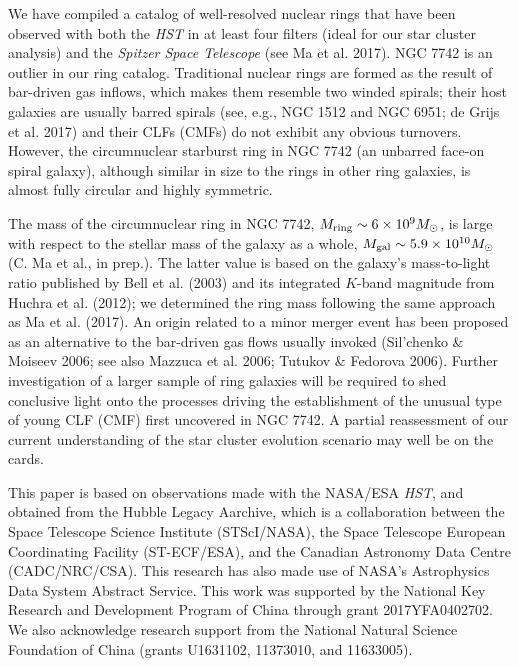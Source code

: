 \documentclass{raa}            %
\begin{document}
We have compiled a catalog of well-resolved nuclear rings that have
been observed with both the {\sl HST} in at least four filters (ideal
for our star cluster analysis) and the {\sl Spitzer Space Telescope}
(see Ma et al. 2017). NGC 7742 is an outlier in our ring
catalog. Traditional nuclear rings are formed as the result of
bar-driven gas inflows, which makes them resemble two winded spirals;
their host galaxies are usually barred spirals (see, e.g., NGC 1512
and NGC 6951; de Grijs et al. 2017) and their CLFs (CMFs) do not
exhibit any obvious turnovers. However, the circumnuclear starburst
ring in NGC 7742 (an unbarred face-on spiral galaxy), although similar
in size to the rings in other ring galaxies, is almost fully circular
and highly symmetric. 

The mass of the circumnuclear ring in NGC 7742, $M_{\rm ring} \sim 6
\times 10^9 M_\odot$, is large with respect to the stellar mass of the
galaxy as a whole, $M_{\rm gal} \sim 5.9 \times 10^{10} M_\odot$
(C. Ma et al., in prep.). The latter value is based on the galaxy's
mass-to-light ratio published by Bell et al. (2003) and its integrated
$K$-band magnitude from Huchra et al. (2012); we determined the ring
mass following the same approach as Ma et al. (2017). An origin
related to a minor merger event has been proposed as an alternative to
the bar-driven gas flows usually invoked (Sil'chenko \& Moiseev 2006;
see also Mazzuca et al. 2006; Tutukov \& Fedorova 2006). Further
investigation of a larger sample of ring galaxies will be required to
shed conclusive light onto the processes driving the establishment of
the unusual type of young CLF (CMF) first uncovered in NGC 7742. A
partial reassessment of our current understanding of the star cluster
evolution scenario may well be on the cards.

\begin{acknowledgements}
This paper is based on observations made with the NASA/ESA {\sl HST},
and obtained from the Hubble Legacy Aarchive, which is a collaboration
between the Space Telescope Science Institute (STScI/NASA), the Space
Telescope European Coordinating Facility (ST-ECF/ESA), and the
Canadian Astronomy Data Centre (CADC/NRC/CSA). This research has also
made use of NASA's Astrophysics Data System Abstract Service. This
work was supported by the National Key Research and Development
Program of China through grant 2017YFA0402702. We also acknowledge
research support from the National Natural Science Foundation of China
(grants U1631102, 11373010, and 11633005).
\end{acknowledgements}
\end{document}
